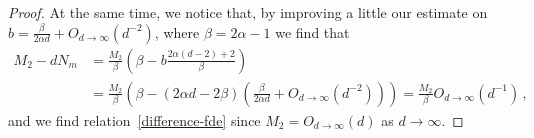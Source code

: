 \documentclass[10pt,reqno]{amsart}
\numberwithin{equation}{section}
\begin{document}
\begin{proof}
At the same time, we notice that, by improving a little our estimate on $b=\frac{\beta}{2\alpha d}+O_{d\to\infty}(d^{-2})$, where $\beta=2\alpha-1$ we find that
\begin{equation}\label{last-limit}
\begin{split}
M_2-dN_m&= \frac{M_2}{\beta}\left(\beta -b\frac{2\alpha(d-2)+2}{\beta}\right) \\
&=\frac{M_2}{\beta}\left(\beta-(2\alpha d - 2\beta)\left(\frac{\beta}{2\alpha d}+O_{d\rightarrow\infty}(d^{-2})\right)\right) =\frac{M_2}{\beta} O_{d\to\infty}(d^{-1})\,,
\end{split}
\end{equation}
and we find relation~\eqref{difference-fde} since $M_2=O_{d\to\infty}(d)$ as $d\to\infty$.
\end{proof}
\end{document}
